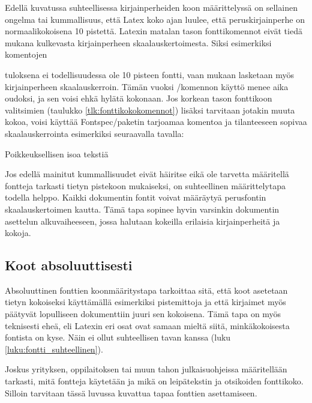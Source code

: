 Edellä kuvatussa suhteellisessa kirjainperheiden koon määrittelyssä on
sellainen ongelma tai kummallisuus, että Latex koko ajan luulee, että
peruskirjainperhe on normaalikokoisena 10 pistettä. Latexin matalan
tason fonttikomennot eivät tiedä mukana kulkevasta kirjainperheen
skaalauskertoimesta. Siksi esimerkiksi komentojen

\begin{koodilohkosis}
  \fontsize{10pt}{12pt} \selectfont
\end{koodilohkosis}

tuloksena ei todellisuudessa ole 10 pisteen fontti, vaan mukaan
lasketaan myös kirjainperheen skaalauskerroin. Tämän vuoksi \-/komennon käyttö menee aika oudoksi, ja sen voisi ehkä
hylätä kokonaan. Jos korkean tason fonttikoon valitsimien (taulukko
\ref{tlk:fonttikokokomennot}) lisäksi tarvitaan jotakin muuta kokoa,
voisi käyttää Fontspec\-/paketin tarjoamaa komentoa ja tilanteeseen
sopivaa skaalauskerrointa esimerkiksi seuraavalla tavalla:

\begin{koodilohkosis}
   Poikkeuksellisen isoa tekstiä
\end{koodilohkosis}

Jos edellä mainitut kummallisuudet eivät häiritse eikä ole tarvetta
määritellä fontteja tarkasti tietyn pistekoon mukaiseksi, on
suhteellinen määrittelytapa todella helppo. Kaikki dokumentin fontit
voivat määräytyä perusfontin skaalauskertoimen kautta. Tämä tapa sopinee
hyvin varsinkin dokumentin asettelun alkuvaiheeseen, jossa halutaan
kokeilla erilaisia kirjainperheitä ja kokoja.

\subsection{Koot absoluuttisesti}
\label{luku:fontti_absoluuttinen}

Absoluuttinen fonttien koonmääritystapa tarkoittaa sitä, että koot
asetetaan tietyn kokoiseksi käyttämällä esimerkiksi pistemittoja ja että
kirjaimet myös päätyvät lopulliseen dokumenttiin juuri sen kokoisena.
Tämä tapa on myös teknisesti eheä, eli Latexin eri osat ovat samaan
mieltä siitä, minkäkokoisesta fontista on kyse. Näin ei ollut
suhteellisen tavan kanssa (luku \ref{luku:fontti_suhteellinen}).

Joskus yrityksen, oppilaitoksen tai muun tahon julkaisu\-ohjeissa
määritellään tarkasti, mitä fontteja käytetään ja mikä on leipätekstin
ja otsikoiden fonttikoko. Silloin tarvitaan tässä luvussa kuvattua tapaa
fonttien asettamiseen.

